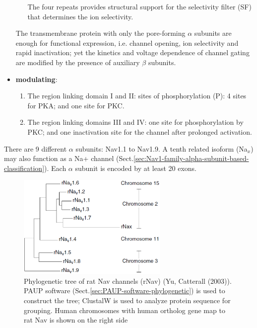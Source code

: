\begin{itemize}
\begin{enumerate}
The four repeats provides structural support for the selectivity filter
(SF) that determines the ion selectivity.

  \end{enumerate}
  
The transmembrane protein with only the pore-forming $\alpha$ subunits are
enough for functional expression, i.e. channel opening, ion selectivity and
rapid inactivation; yet the kinetics and voltage dependence of channel gating
are modified by the presence of auxiliary $\beta$ subunits.
  
  \item {\bf modulating}:
  \begin{enumerate}
    \item The region linking domain I and II: sites of phosphorylation (P): 4
    sites for PKA; and one site for PKC. 
    
    \item The region linking domains III and IV: one site for phosphorylation by
    PKC; and one inactivation site for the channel after prolonged activation.
  \end{enumerate}  
  
\end{itemize}

There are 9 different $\alpha$ subunits: Nav1.1 to Nav1.9. A tenth related
isoform (Na$_x$) may also function as a Na+ channel
(Sect.\ref{sec:Nav1-family-alpha-subunit-based-classification}).
Each $\alpha$ subunit is encoded by at least 20 exons.

\begin{figure}[hbt]
  \centerline{\includegraphics[height=5cm,
    angle=0]{./images/Nav-channel-phylogenetic-tree.eps}}
\caption{Phylogenetic tree of rat Nav channels (rNav) (Yu, Catterall (2003)).
PAUP software (Sect.\ref{sec:PAUP-software-phylogenetic}) is used to construct
the tree; ClustalW is used to analyze protein sequence for grouping. Human
chromosomes with human ortholog gene map to rat Nav is shown on the right side}
\label{fig:Nav-channel-phylogenetic-tree}
\end{figure}

